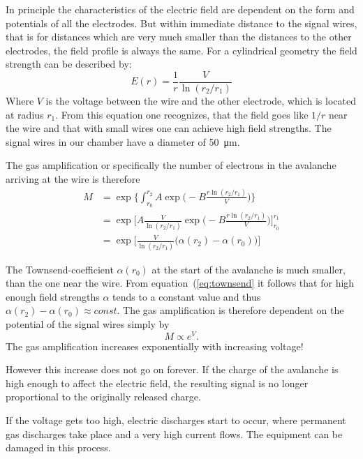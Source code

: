 \documentclass[12pt]{article}
\begin{document}
In principle the characteristics of the electric field are dependent on the form and potentials of all the electrodes. But within immediate distance to the signal wires, that is for distances which are very much smaller than  the distances to the other electrodes, the field profile is always the same. For a cylindrical geometry the field strength can be described by:
\begin{equation}
E(r) = \frac{1}{r} \frac{V}{\ln (r_2/r_1)}
\end{equation}
Where $V$ is the voltage between the wire and the other electrode, which is located at radius $r_1$. From this equation one recognizes, that the field goes like $1/r$ near the wire and that with small wires one can achieve high field strengths. The signal wires in our chamber have a diameter of \SI{50}{\micro\meter}.

The gas amplification or specifically the number of electrons in the avalanche arriving at the wire is therefore
\begin{align*}
M &= \exp \Biggl\{ \int_{r_0}^{r_2} A \exp \Biggl( - B \frac{r \ln(r_2/r_1)}{V}\Biggr)\Biggr\} \\
&= \exp \Biggl[ A \frac{V}{\ln(r_2/r_1)} \exp \Biggl( - B \frac{r \ln(r_2/r_1)}{V} \Biggr) \Biggr]_{r_0}^{r_1} \\
& = \exp \Biggl[ \frac{V}{\ln(r_2/r_1)} \bigl(\alpha(r_2) - \alpha (r_0)\bigr) \Biggr]
\end{align*}

The Townsend-coefficient $\alpha(r_0)$ at the start of the avalanche is much smaller, than the one near the wire. From equation~(\ref{eq:townsend} it follows that for high enough field strengths $\alpha$ tends to a constant value and thus $\alpha(r_2) - \alpha(r_0) \approx const.$ The gas amplification is therefore  dependent on the potential of the signal wires simply by
\begin{equation}
M \propto e^V.
\end{equation}
The gas amplification increases exponentially with increasing voltage!

However this increase does not go on forever. If the charge of the  avalanche is high enough to affect the electric field, the resulting signal is no longer proportional to the originally released charge.

If the voltage gets too high, electric discharges start to occur, where permanent gas discharges take place and a very high current flows. The equipment can be damaged in this process. 
\end{document}
